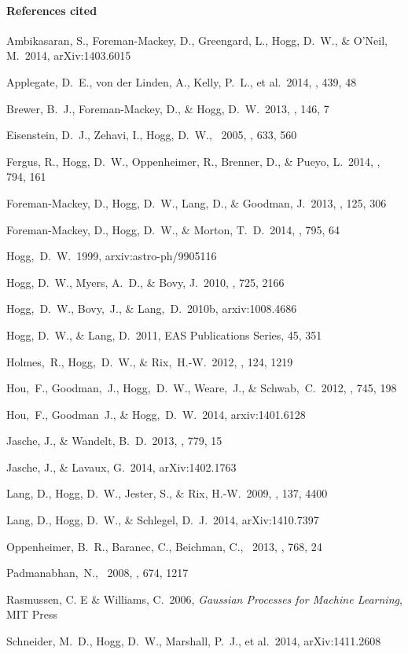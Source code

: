 \documentclass[12pt]{article}
\begin{document}
\sloppy\sloppypar\thispagestyle{empty}

\paragraph{References cited}
\begin{trivlist}
\item Ambikasaran, S., Foreman-Mackey, D., Greengard, L., Hogg, D.~W., \& O'Neil, M.\ 2014, arXiv:1403.6015
\item Applegate, D.~E., von der Linden, A., Kelly, P.~L., et al.\ 2014, \mnras, 439, 48
\item Brewer, B.~J., Foreman-Mackey, D., \& Hogg, D.~W.\ 2013, \aj, 146, 7
\item Eisenstein, D.~J., Zehavi, I., Hogg, D.~W., \etal\ 2005, \apj, 633, 560
\item Fergus, R., Hogg, D.~W., Oppenheimer, R., Brenner, D., \& Pueyo, L.\ 2014, \apj, 794, 161
\item Foreman-Mackey, D., Hogg, D.~W., Lang, D., \& Goodman, J.\ 2013, \pasp, 125, 306
\item Foreman-Mackey, D., Hogg, D.~W., \& Morton, T.~D.\ 2014, \apj, 795, 64
\item Hogg,~D.~W.\ 1999, arxiv:astro-ph/9905116
\item Hogg, D.~W., Myers, A.~D., \& Bovy, J.\ 2010, \apj, 725, 2166
\item Hogg,~D.~W., Bovy,~J., \& Lang,~D.\ 2010b, arxiv:1008.4686
\item Hogg, D.~W., \& Lang, D.\ 2011, EAS Publications Series, 45, 351
\item Holmes,~R., Hogg,~D.~W., \& Rix,~H.-W.\ 2012, \pasp, 124, 1219
\item Hou,~F., Goodman,~J., Hogg,~D.~W., Weare,~J., \& Schwab,~C.\ 2012, \apj, 745, 198
\item Hou,~F., Goodman~J., \& Hogg,~D.~W.\ 2014, arxiv:1401.6128
\item Jasche, J., \& Wandelt, B.~D.\ 2013, \apj, 779, 15
\item Jasche, J., \& Lavaux, G.\ 2014, arXiv:1402.1763
\item Lang, D., Hogg, D.~W., Jester, S., \& Rix, H.-W.\ 2009, \aj, 137, 4400
\item Lang, D., Hogg, D.~W., \& Schlegel, D.~J.\ 2014, arXiv:1410.7397
\item Oppenheimer, B.~R., Baranec, C., Beichman, C., \etal\ 2013, \apj, 768, 24
\item Padmanabhan,~N., \etal\ 2008, \apj, 674, 1217
\item Rasmussen, C. E \& Williams, C.\ 2006, \textit{Gaussian Processes for Machine Learning}, MIT Press
\item Schneider, M.~D., Hogg, D.~W., Marshall, P.~J., et al.\ 2014, arXiv:1411.2608
\end{trivlist}
\end{document}
